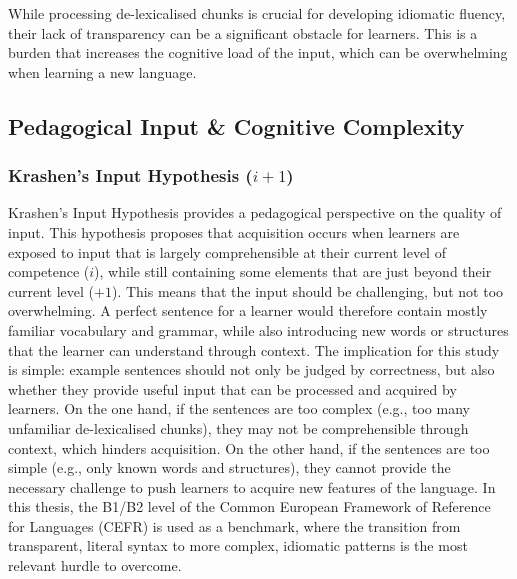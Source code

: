 \documentclass[11pt,a4paper]{article}
\begin{document}
While processing de-lexicalised chunks is crucial for developing idiomatic fluency, their lack of transparency can be a significant obstacle for learners. This is a burden that increases the cognitive load \parencite{swellerCognitiveLoadProblem1988a} of the input, which can be overwhelming when learning a new language.

\subsection{Pedagogical Input \& Cognitive Complexity }\label{subsec:pedagogy-cognitive}

\subsubsection{Krashen's Input Hypothesis (\texorpdfstring{$i+1$}{i+1})}\label{subsubsec:krashen}

Krashen's Input Hypothesis \parencite*{krashenInputHypothesisIssues1985} provides a pedagogical perspective on the quality of input. This hypothesis proposes that acquisition occurs when learners are exposed to input that is largely comprehensible at their current level of competence ($i$), while still containing some elements that are just beyond their current level ($+1$). This means that the input should be challenging, but not too overwhelming. A perfect sentence for a learner would therefore contain mostly familiar vocabulary and grammar, while also introducing new words or structures that the learner can understand through context. The implication for this study is simple: example sentences should not only be judged by correctness, but also whether they provide useful input that can be processed and acquired by learners. On the one hand, if the sentences are too complex (e.g., too many unfamiliar de-lexicalised chunks), they may not be comprehensible through context, which hinders acquisition. On the other hand, if the sentences are too simple (e.g., only known words and structures), they cannot provide the necessary challenge to push learners to acquire new features of the language. In this thesis, the B1/B2 level of the Common European Framework of Reference for Languages (CEFR) is used as a benchmark, where the transition from transparent, literal syntax to more complex, idiomatic patterns is the most relevant hurdle to overcome.
\end{document}
